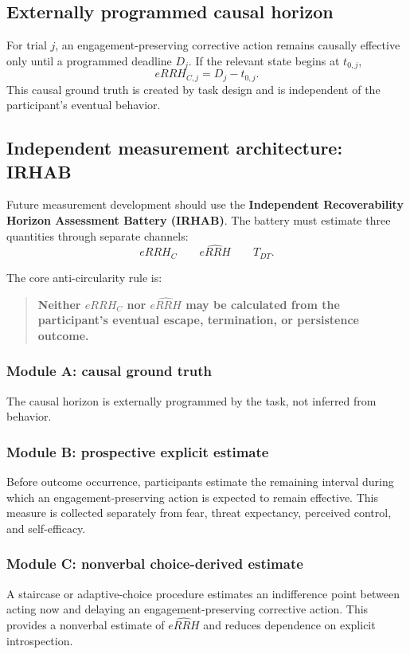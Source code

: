 \documentclass[9pt,twocolumn]{article}
\begin{document}
\subsection{Externally programmed causal horizon}
For trial $j$, an engagement-preserving corrective action remains causally effective only until a programmed deadline $D_j$. If the relevant state begins at $t_{0,j}$,
\[
eRRH_{C,j}=D_j-t_{0,j}.
\]
This causal ground truth is created by task design and is independent of the participant's eventual behavior.

\subsection{Independent measurement architecture: IRHAB}
Future measurement development should use the \textbf{Independent Recoverability Horizon Assessment Battery (IRHAB)}. The battery must estimate three quantities through separate channels:
\[
\boxed{eRRH_C}\qquad\boxed{\widehat{eRRH}}\qquad\boxed{T_{DT}}.
\]

The core anti-circularity rule is:
\begin{quote}
\textbf{Neither $eRRH_C$ nor $\widehat{eRRH}$ may be calculated from the participant's eventual escape, termination, or persistence outcome.}
\end{quote}

\subsubsection{Module A: causal ground truth}
The causal horizon is externally programmed by the task, not inferred from behavior.

\subsubsection{Module B: prospective explicit estimate}
Before outcome occurrence, participants estimate the remaining interval during which an engagement-preserving action is expected to remain effective. This measure is collected separately from fear, threat expectancy, perceived control, and self-efficacy.

\subsubsection{Module C: nonverbal choice-derived estimate}
A staircase or adaptive-choice procedure estimates an indifference point between acting now and delaying an engagement-preserving corrective action. This provides a nonverbal estimate of $\widehat{eRRH}$ and reduces dependence on explicit introspection.
\end{document}
